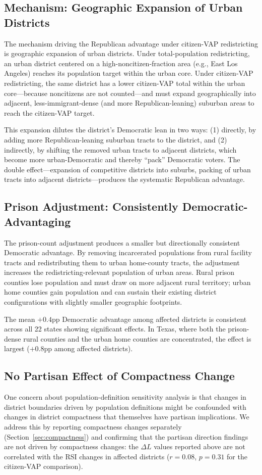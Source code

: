 \subsection{Mechanism: Geographic Expansion of Urban Districts}

The mechanism driving the Republican advantage under citizen-VAP redistricting is geographic expansion of urban districts. Under total-population redistricting, an urban district centered on a high-noncitizen-fraction area (e.g., East Los Angeles) reaches its population target within the urban core. Under citizen-VAP redistricting, the same district has a lower citizen-VAP total within the urban core---because noncitizens are not counted---and must expand geographically into adjacent, less-immigrant-dense (and more Republican-leaning) suburban areas to reach the citizen-VAP target.

This expansion dilutes the district's Democratic lean in two ways: (1) directly, by adding more Republican-leaning suburban tracts to the district, and (2) indirectly, by shifting the removed urban tracts to adjacent districts, which become more urban-Democratic and thereby ``pack'' Democratic voters. The double effect---expansion of competitive districts into suburbs, packing of urban tracts into adjacent districts---produces the systematic Republican advantage.

\subsection{Prison Adjustment: Consistently Democratic-Advantaging}

The prison-count adjustment produces a smaller but directionally consistent Democratic advantage. By removing incarcerated populations from rural facility tracts and redistributing them to urban home-county tracts, the adjustment increases the redistricting-relevant population of urban areas. Rural prison counties lose population and must draw on more adjacent rural territory; urban home counties gain population and can sustain their existing district configurations with slightly smaller geographic footprints.

The mean $+0.4$pp Democratic advantage among affected districts is consistent across all 22 states showing significant effects. In Texas, where both the prison-dense rural counties and the urban home counties are concentrated, the effect is largest ($+0.8$pp among affected districts).

\subsection{No Partisan Effect of Compactness Change}

One concern about population-definition sensitivity analysis is that changes in district boundaries driven by population definitions might be confounded with changes in district compactness that themselves have partisan implications. We address this by reporting compactness changes separately (Section~\ref{sec:compactness}) and confirming that the partisan direction findings are not driven by compactness changes: the $\Delta L$ values reported above are not correlated with the RSI changes in affected districts ($r = 0.08$, $p = 0.31$ for the citizen-VAP comparison).
